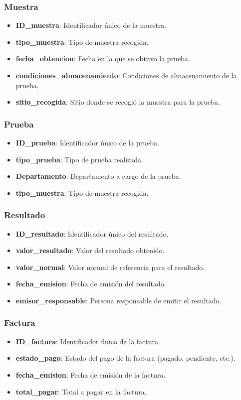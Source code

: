 \documentclass[spanish]{article}
\begin{document}
\subsubsection*{Muestra}
\begin{itemize}
    \item \textbf{ID\_muestra}: Identificador único de la muestra.
    \item \textbf{tipo\_muestra}: Tipo de muestra recogida.
    \item \textbf{fecha\_obtencion}: Fecha en la que se obtuvo la prueba.
    \item \textbf{condiciones\_almacenamiento}: Condiciones de almacenamiento de la prueba.
    \item \textbf{sitio\_recogida}: Sitio donde se recogió la muestra para la prueba.
\end{itemize}

\subsubsection*{Prueba}
\begin{itemize}
    \item \textbf{ID\_prueba}: Identificador único de la prueba.
    \item \textbf{tipo\_prueba}: Tipo de prueba realizada.
    \item \textbf{Departamento}: Departamento a cargo de la prueba.
    \item \textbf{tipo\_muestra}: Tipo de muestra recogida.
\end{itemize}

\subsubsection*{Resultado}
\begin{itemize}
    \item \textbf{ID\_resultado}: Identificador único del resultado.
    \item \textbf{valor\_resultado}: Valor del resultado obtenido.
    \item \textbf{valor\_normal}: Valor normal de referencia para el resultado.
    \item \textbf{fecha\_emision}: Fecha de emisión del resultado.
    \item \textbf{emisor\_responsable}: Persona responsable de emitir el resultado.
\end{itemize}

\subsubsection*{Factura}
\begin{itemize}
    \item \textbf{ID\_factura}: Identificador único de la factura.
    \item \textbf{estado\_pago}: Estado del pago de la factura (pagado, pendiente, etc.).
    \item \textbf{fecha\_emision}: Fecha de emisión de la factura.
    \item \textbf{total\_pagar}: Total a pagar en la factura.
\end{itemize}
\end{document}
